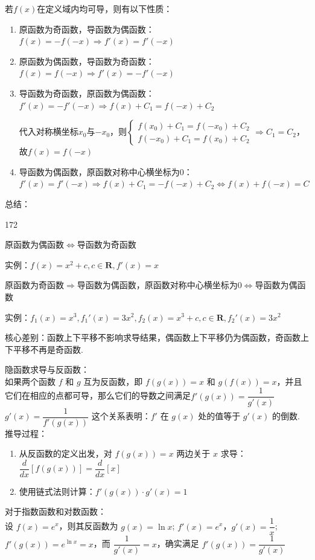若$f(x)$在定义域内均可导，则有以下性质：
\begin{enumerate}
    \item 原函数为奇函数，导函数为偶函数：$f(x) = -f(-x)\Longrightarrow f'(x) = f'(-x)$
    \item 原函数为偶函数，导函数为奇函数：$f(x) = f(-x) \Longrightarrow f'(x) = -f'(-x)$
    \item 导函数为奇函数，原函数为偶函数：$f'(x) = -f'(-x)\Longrightarrow f(x) + C_1 = f(-x) + C_2$

    代入对称横坐标$x_0$与$-x_0$，则$\left\{\begin{array}{l}
         f(x_0) + C_1 = f(-x_0) + C_2 \\
         f(-x_0) + C_1 = f(x_0) + C_2 
    \end{array}\right. \Longrightarrow C_1 = C_2$，故$f(x) = f(-x) $
    
    \item 导函数为偶函数，原函数对称中心横坐标为0：$f'(x) = f'(-x)\Longrightarrow f(x) + C_1 = -f(-x) + C_2 \Longleftrightarrow f(x) + f(-x) = C$
\end{enumerate}
总结：
\begin{dingautolist}{172}
    \item 原函数为偶函数$\Longleftrightarrow$导函数为奇函数
    
    实例：$f(x) = x^2+c, c\in \mathbf{R}, f'(x) = x$
    \item 原函数为奇函数$\Longrightarrow$导函数为偶函数，原函数对称中心横坐标为0$\Longleftrightarrow$导函数为偶函数
    
    实例：$f_1(x) = x^3, f_1'(x) = 3x^2, f_2(x) = x^3+c, c\in \mathbf{R}, f_2'(x) = 3x^2$

    \item 核心差别：函数上下平移不影响求导结果，偶函数上下平移仍为偶函数，奇函数上下平移不再是奇函数.
\end{dingautolist}



隐函数求导与反函数：\\
如果两个函数 $ f $ 和 $ g $ 互为反函数，即 $ f(g(x)) = x $ 和 $ g(f(x)) = x $，并且它们在相应的点都可导，那么它们的导数之间满足$f'(g(x)) = \dfrac{1}{g'(x)}$ \quad {} \quad $g'(x) = \dfrac{1}{f'(g(x))}$
这个关系表明：$ f' $ 在 $ g(x) $ 处的值等于 $ g'(x) $ 的倒数. \\
推导过程：
\begin{enumerate}
    \item 从反函数的定义出发，对 $ f(g(x)) = x $ 两边关于 $ x $ 求导：$\dfrac{d}{dx} [f(g(x))] = \dfrac{d}{dx} [x]$
    \item 使用链式法则计算：$f'(g(x)) \cdot g'(x) = 1$
\end{enumerate}
\begin{example}
    对于指数函数和对数函数：\\
    设 $ f(x) = e^x $，则其反函数为 $ g(x) = \ln x $; $ f'(x) = e^x $，$ g'(x) = \dfrac{1}{x} $; $ f'(g(x)) = e^{\ln x} = x $，而 $ \dfrac{1}{g'(x)} = x $，确实满足 $ f'(g(x)) = \dfrac{1}{g'(x)} $
\end{example}

